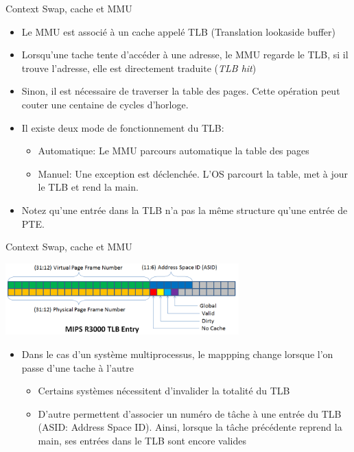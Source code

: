 \begin{frame}[fragile=singleslide]{Context Swap, cache et MMU}
  \begin{itemize}
  \item  Le  MMU est  associé  à  un  cache appelé  TLB  (Translation
    lookaside buffer)
  \item  Lorsqu'une  tache tente  d'accéder  à  une  adresse, le  MMU
    regarde  le TLB,  si il  trouve l'adresse,  elle  est directement
    traduite (\emph{TLB hit})
  \item  Sinon,   il  est  nécessaire   de  traverser  la   table  des
    pages.  Cette  opération  peut   couter  une  centaine  de  cycles
    d'horloge.
  \item Il existe deux mode de fonctionnement du TLB:
    \begin{itemize}
    \item Automatique: Le MMU parcours automatique la table des pages
    \item  Manuel: Une  exception  est déclenchée.   L'OS parcourt  la
      table, met à jour le TLB et rend la main.
    \end{itemize}
    \item Notez qu'une entrée dans la TLB n'a pas la même structure qu'une entrée de PTE.
  \end{itemize}
\end{frame}

\begin{frame}[fragile=singleslide]{Context Swap, cache et MMU}
    \begin{center}
      \includegraphics[width=9cm]{pics/mipsr3000_tlb}
    \end{center}    
  \begin{itemize}
  \item Dans  le cas d'un  système multiprocessus, le  mappping change
    lorsque l'on passe d'une tache à l'autre
    \begin{itemize}
    \item  Certains systèmes nécessitent  d'invalider la  totalité du
      TLB
    \item  D'autre permettent  d'associer  un numéro  de  tâche à  une
      entrée  du TLB (ASID: Address Space ID). Ainsi,  lorsque la  tâche précédente  reprend la
      main, ses entrées dans le TLB sont encore valides
    \end{itemize}
  \end{itemize}
\end{frame}

